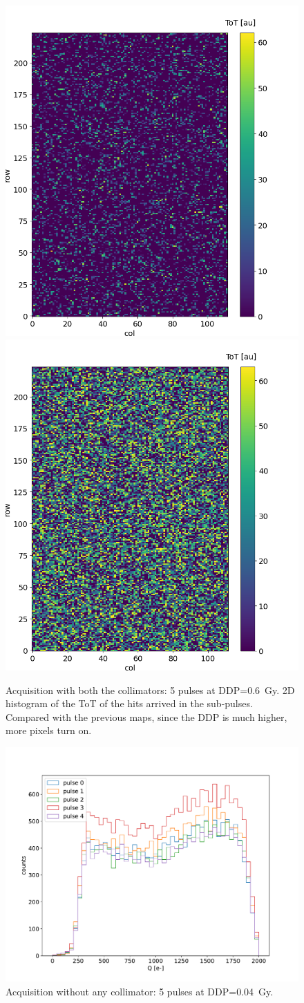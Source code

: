    \begin{figure}
      \centering
      \includegraphics[width=.49\linewidth]{figures/test_beam/tot_mapq1_15-57.png}
      \includegraphics[width=.49\linewidth]{figures/test_beam/tot_mapq2_15-57.png}  
      \caption{Acquisition with both the collimators: 5 pulses at DDP=\SI{0.6}{Gy}. 2D histogram of the ToT of the hits arrived in the sub-pulses. Compared with the previous maps, since the DDP is much higher, more pixels turn on.}
      \label{fig:}
   \end{figure}
   \begin{figure}
      \centering
      \includegraphics[width=.7\linewidth]{figures/test_beam/Qe_17_32.pdf}
      \caption{Acquisition without any collimator: 5 pulses at DDP=\SI{0.04}{Gy}.}
      \label{fig:without_collimator}
   \end{figure}

